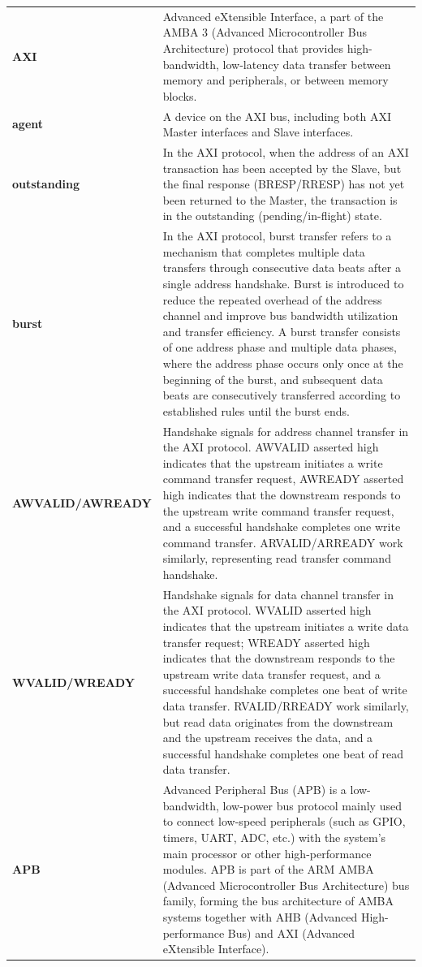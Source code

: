 \documentclass[main\_\_EN.tex]{subfiles}
\begin{document}
\begin{longtable}[c]{ R{3.1 cm} p{13.5 cm} }
    \textbf{AXI} & Advanced eXtensible Interface, a part of the AMBA 3 (Advanced Microcontroller Bus Architecture) protocol that provides high-bandwidth, low-latency data transfer between memory and peripherals, or between memory blocks.\\
    \textbf{agent} & A device on the AXI bus, including both AXI Master interfaces and Slave interfaces.\\
    \textbf{outstanding} & In the AXI protocol, when the address of an AXI transaction has been accepted by the Slave, but the final response (BRESP/RRESP) has not yet been returned to the Master, the transaction is in the outstanding (pending/in-flight) state.\\
    \textbf{burst} & In the AXI protocol, burst transfer refers to a mechanism that completes multiple data transfers through consecutive data beats after a single address handshake. Burst is introduced to reduce the repeated overhead of the address channel and improve bus bandwidth utilization and transfer efficiency. A burst transfer consists of one address phase and multiple data phases, where the address phase occurs only once at the beginning of the burst, and subsequent data beats are consecutively transferred according to established rules until the burst ends.\\
    \textbf{AWVALID/AWREADY} & Handshake signals for address channel transfer in the AXI protocol. AWVALID asserted high indicates that the upstream initiates a write command transfer request, AWREADY asserted high indicates that the downstream responds to the upstream write command transfer request, and a successful handshake completes one write command transfer. ARVALID/ARREADY work similarly, representing read transfer command handshake. \\
    \textbf{WVALID/WREADY} & Handshake signals for data channel transfer in the AXI protocol. WVALID asserted high indicates that the upstream initiates a write data transfer request; WREADY asserted high indicates that the downstream responds to the upstream write data transfer request, and a successful handshake completes one beat of write data transfer. RVALID/RREADY work similarly, but read data originates from the downstream and the upstream receives the data, and a successful handshake completes one beat of read data transfer.\\
    \textbf{APB} & Advanced Peripheral Bus (APB) is a low-bandwidth, low-power bus protocol mainly used to connect low-speed peripherals (such as GPIO, timers, UART, ADC, etc.) with the system's main processor or other high-performance modules. APB is part of the ARM AMBA (Advanced Microcontroller Bus Architecture) bus family, forming the bus architecture of AMBA systems together with AHB (Advanced High-performance Bus) and AXI (Advanced eXtensible Interface).\\

\end{longtable}
\end{document}
